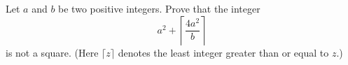 Let $a$ and $b$ be two positive integers. Prove that the integer
\[a^2+\left\lceil\frac{4a^2}b\right\rceil\]is not a square. (Here $\lceil z\rceil$ denotes the least integer greater than or equal to $z$.)
